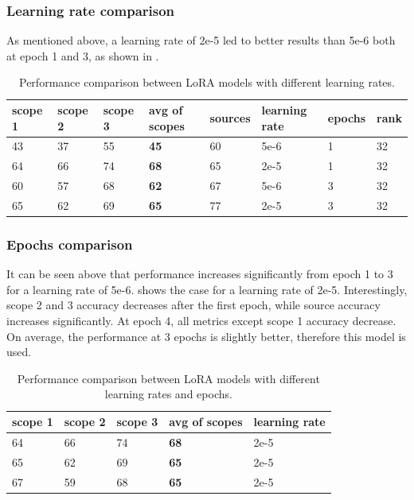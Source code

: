 \documentclass[]{article}
\begin{document}
\subsubsection{Learning rate comparison}

As mentioned above, a learning rate of 2e-5 led to better results than 5e-6 both at epoch 1 and 3, as shown in .

\begin{table}[h]
	\centering
	\begin{tabular}{|l|l|l|l|l|l|l|l|}
		\hline
		scope 1 & scope 2 & scope 3 & avg of scopes & sources & learning rate & epochs & rank \\\hline
		43 & 37 & 55 & \textbf{45} & 60 & 5e-6 & 1 & 32 \\\hline
		64 & 66 & 74 & \textbf{68} & 65 & 2e-5 & 1 & 32 \\\hline
		60 & 57 & 68 & \textbf{62} & 67 & 5e-6 & 3 & 32 \\\hline
		65 & 62 & 69 & \textbf{65} & 77 & 2e-5 & 3 & 32 \\\hline
	\end{tabular}
	\caption{Performance comparison between LoRA models with different learning rates.}
	\label{tab:lr-comparison}
\end{table}

\subsubsection{Epochs comparison}

It can be seen above that performance increases significantly from epoch 1 to 3 for a learning rate of 5e-6.  shows the case for a learning rate of 2e-5. Interestingly, scope 2 and 3 accuracy decreases after the first epoch, while source accuracy increases significantly. At epoch 4, all metrics except scope 1 accuracy decrease. On average, the performance at 3 epochs is slightly better, therefore this model is used.

\begin{table}[h]
	\centering
	\begin{tabular}{|l|l|l|l|l|}
		\hline
		scope 1 & scope 2 & scope 3 & avg of scopes & learning rate \\\hline
		64 & 66 & 74 & \textbf{68} & 2e-5 \\\hline
		65 & 62 & 69 & \textbf{65} & 2e-5 \\\hline
		67 & 59 & 68 & \textbf{65} & 2e-5 \\\hline
	\end{tabular}
	\caption{Performance comparison between LoRA models with different learning rates and epochs.}
	\label{tab:epochs-lr-comparison}
\end{table}
\end{document}
